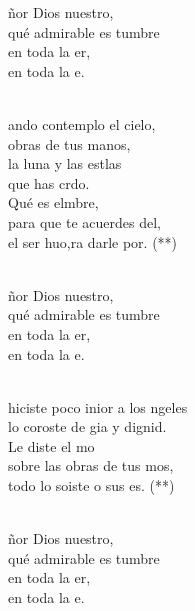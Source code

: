 \documentclass[12pt]{article}
\begin{document}
\begin{multicols*}{2}
\begin{cancion}%
	\begin{chorus}%
	ñor Dios nuestro,\\
	qué admirable es tumbre\\
	en toda la er,\\
	en toda la e.\\
	\end{chorus}%
	\jump\\
	ando contemplo el cielo,\\
obras de tus manos,\\
	la luna y las estlas\\
	que has crdo.\\
	Qué es elmbre,\\
	para que te acuerdes del, \\
	el ser huo,ra darle por. (**)\\\jump\\
	\begin{chorus}%
	ñor Dios nuestro,\\
	qué admirable es tumbre\\
	en toda la er,\\
	en toda la e.\\
	\end{chorus}%
	\jump\\
	 hiciste poco inior a los ngeles\\
	lo coroste de gia y dignid.\\
	Le diste el mo \\
	sobre las obras de tus mos,\\
	todo lo soiste o sus es. (**)\\\jump\\
	\begin{chorus}%
	ñor Dios nuestro,\\
	qué admirable es tumbre\\
	en toda la er,\\
	en toda la e.\\
	\end{chorus}%
	\jump\\
\end{cancion}%


\end{multicols*}
\end{document}
